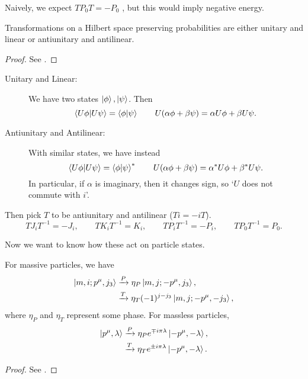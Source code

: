 Naively, we expect $T P_0 T = -P_0$ , but this would imply negative energy.
\begin{theorem}[Wigner]
  Transformations on a Hilbert space preserving probabilities are either unitary and linear or antiunitary and antilinear.
\end{theorem}
\begin{proof}
  See \cite[Vol.~1]{weinberg}.
\end{proof}
\begin{description}
  \item[Unitary and Linear:] We have two states $\ket{\phi}, \ket{\psi}$. Then
    \begin{equation}
      \bra{U \phi} \ket{U \psi} = \bra{\phi}\ket{\psi} \qquad U (\alpha \phi + \beta \psi) = \alpha U \phi + \beta U \psi.
    \end{equation}
  \item[Antiunitary and Antilinear:] With similar states, we have instead
    \begin{equation}
      \bra{U \phi} \ket{U \psi} = \bra{\phi}\ket{\psi}^* \qquad U (\alpha \phi + \beta \psi) = \alpha^* U \phi + \beta^* U \psi.
    \end{equation}
    In particular, if $\alpha$ is imaginary, then it changes sign, so `$U$ does not commute with $i$'.
\end{description}
Then pick $T$ to be antiunitary and antilinear ($Ti = -i T$).
\begin{equation}
  T J_i T^{-1} = -J_i, \qquad
  T K_i T^{-1} = K_i, \qquad
  T P_i T^{-1} = -P_i, \qquad
  T P_0 T^{-1} = P_0.
\end{equation}

Now we want to know how these act on particle states.
\begin{claim}
  For massive particles, we have
  \begin{align}
    \ket{m, i; p^{\mu}, j_3} &\xrightarrow{P} \eta_P \ket{m, j; -p^{\mu}, j_3}, \\
			     &\xrightarrow{T} \eta_T (-1)^{j-j_3} \ket{m, j; -p^{\mu}, -j_3},
  \end{align}
  where $\eta_P$ and $\eta_T$ represent some phase.
  For massless particles, 
  \begin{align}
    \ket{p^{\mu}, \lambda} &\xrightarrow{P} \eta_P e^{\mp i \pi \lambda} \ket{-p^{\mu}, -\lambda}, \\
			     &\xrightarrow{T} \eta_T e^{\pm i \pi \lambda} \ket{-p^{\mu}, -\lambda}.
  \end{align}
\end{claim}
\begin{proof}
  See \cite[Vol.~1]{weinberg}.
\end{proof}

